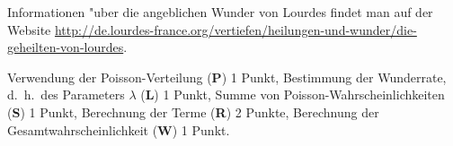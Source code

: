 \begin{diskussion}
Informationen "uber die angeblichen Wunder von Lourdes findet man auf
der Website \url{http://de.lourdes-france.org/vertiefen/heilungen-und-wunder/die-geheilten-von-lourdes}.
\end{diskussion}

\begin{bewertung}
Verwendung der Poisson-Verteilung (\textbf{P}) 1 Punkt,
Bestimmung der Wunderrate, d.~h.~des Parameters $\lambda$ (\textbf{L}) 1 Punkt,
Summe von Poisson-Wahrscheinlichkeiten (\textbf{S}) 1 Punkt,
Berechnung der Terme (\textbf{R}) 2 Punkte,
Berechnung der Gesamtwahrscheinlichkeit (\textbf{W}) 1 Punkt.
\end{bewertung}

